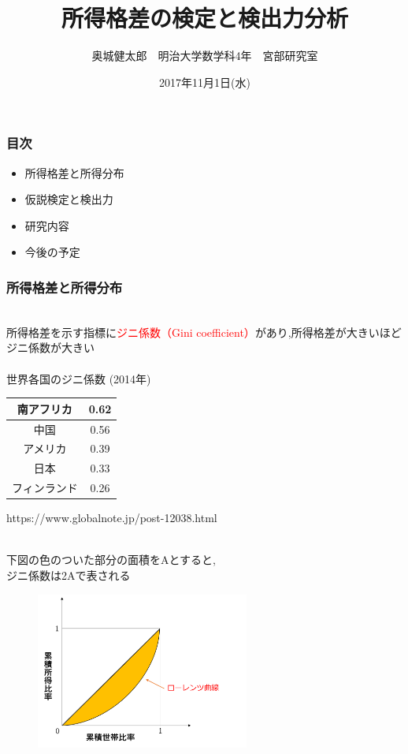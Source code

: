 \documentclass[dvipdfmx,14pt]{beamer}
\title{所得格差の検定と検出力分析}
\author{奥城健太郎　明治大学数学科4年　宮部研究室}
\institute{解析系卒業論文中間発表会}
\date{2017年11月1日(水)}
\begin{document}
\begin{frame}
\frametitle{}
\titlepage
\end{frame}

\begin{frame}
\frametitle{目次}
\large
\begin{itemize}
 \item 所得格差と所得分布
 \item 仮説検定と検出力
 \item 研究内容
 \item 今後の予定
\end{itemize}
\end{frame}

\begin{frame}
\frametitle{所得格差と所得分布}
\ \\ 
所得格差を示す指標に\textcolor{red}{ジニ係数（Gini coefficient）}があり,所得格差が大きいほどジニ係数が大きい \\
\ \\
世界各国のジニ係数 (2014年) \\
{\small
\begin{center}
\begin{tabular}{|c|c|} \hline
 南アフリカ & 0.62 \\ \hline
 中国 & 0.56 \\ \hline
 アメリカ & 0.39 \\ \hline
 日本 & 0.33 \\ \hline
 フィンランド & 0.26 \\ \hline
\end{tabular}
\end{center}
}
\begin{flushright}
\footnotesize https://www.globalnote.jp/post-12038.html
\end{flushright}
\end{frame}

\begin{frame}
\ \\
下図の色のついた部分の面積をAとすると, \\
ジニ係数は2Aで表される
\begin{figure}
\includegraphics[width=7cm]{図1}
\end{figure}
\end{frame}
\end{document}
